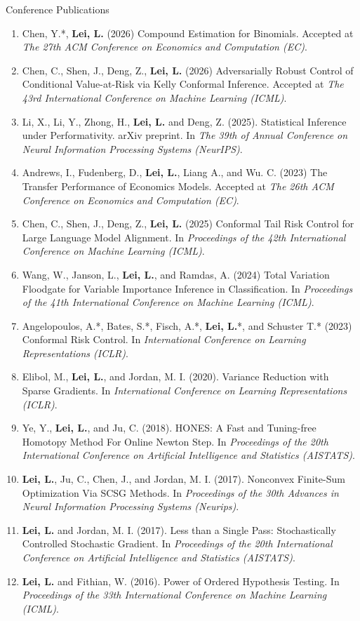 \documentclass{article}
\begin{document}
\begin{large}
\noindent Conference Publications
\end{large}

\begin{enumerate} 
\item Chen, Y.*, \textbf{Lei, L.} (2026) Compound Estimation for Binomials. Accepted at \emph{The 27th ACM Conference on Economics and Computation (EC)}.
\item Chen, C., Shen, J., Deng, Z., \textbf{Lei, L.} (2026) Adversarially Robust Control of Conditional Value-at-Risk via Kelly Conformal Inference. Accepted at \emph{The 43rd International Conference on Machine Learning (ICML)}.
\item Li, X., Li, Y., Zhong, H., \textbf{Lei, L.} and Deng, Z. (2025). Statistical Inference under Performativity. arXiv preprint. In \emph{The 39th of Annual Conference on Neural Information Processing Systems (NeurIPS)}.
\item Andrews, I., Fudenberg, D., \textbf{Lei, L.}, Liang A., and Wu. C. (2023) The Transfer Performance of Economics Models. Accepted at \emph{The 26th ACM Conference on Economics and Computation (EC)}.
\item Chen, C., Shen, J., Deng, Z., \textbf{Lei, L.} (2025) Conformal Tail Risk Control for Large Language Model Alignment. In \emph{Proceedings of the 42th International Conference on Machine Learning (ICML)}.
\item Wang, W., Janson, L., \textbf{Lei, L.}, and Ramdas, A. (2024) Total Variation Floodgate for Variable Importance Inference in Classification. In \emph{Proceedings of the 41th International Conference on Machine Learning (ICML)}.
\item Angelopoulos, A.*, Bates, S.*, Fisch, A.*, \textbf{Lei, L.}*, and Schuster T.* (2023) Conformal Risk Control. In \emph{International Conference on Learning Representations (ICLR)}.
\item Elibol, M., \textbf{Lei, L.}, and Jordan, M. I. (2020). Variance Reduction with Sparse Gradients. In \emph{International Conference on Learning Representations (ICLR)}.
\item Ye, Y., \textbf{Lei, L.}, and Ju, C. (2018). HONES: A Fast and Tuning-free Homotopy Method For Online Newton Step. In \emph{Proceedings of the 20th International Conference on Artificial Intelligence and Statistics (AISTATS)}.
\item \textbf{Lei, L.}, Ju, C., Chen, J., and Jordan, M. I. (2017). Nonconvex Finite-Sum Optimization Via SCSG Methods. In \emph{Proceedings of the 30th Advances in Neural Information Processing Systems (Neurips)}.
\item \textbf{Lei, L.} and Jordan, M. I. (2017). Less than a Single Pass: Stochastically Controlled Stochastic Gradient. In \emph{Proceedings of the 20th International Conference on Artificial Intelligence and Statistics (AISTATS)}.
\item \textbf{Lei, L.} and Fithian, W. (2016). Power of Ordered Hypothesis Testing. In \emph{Proceedings of the 33th International Conference on Machine Learning (ICML)}.
\end{enumerate}
\end{document}
